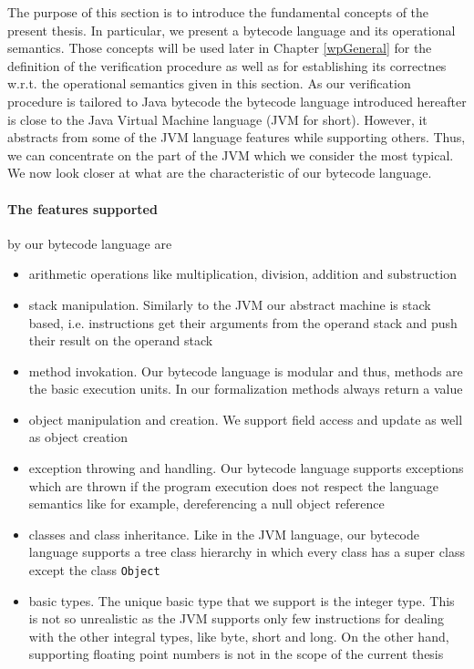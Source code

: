 \newtheorem{StateTransition}{Definition}[subsection]
\newtheorem{transClosStateTrans}[StateTransition]{Definition}

 The purpose of this section is to introduce the fundamental concepts of the
 present thesis. In particular, we present a bytecode language 
 and its operational semantics. Those concepts will be used later in Chapter \ref{wpGeneral}
 for the definition of the verification
 procedure as well as for establishing 
 its correctnes w.r.t. the operational semantics
 given in this section. As our verification procedure is tailored to Java bytecode 
 the bytecode language introduced hereafter is close to the Java Virtual Machine 
 language \cite{VMSpec}(JVM for short). However, it abstracts from some of the JVM language
 features while supporting others. Thus, we can concentrate on the part of the JVM which we consider
 the most typical. We now look closer at what are the characteristic of our bytecode language. 

\paragraph{The features supported}  by our bytecode language are 
\begin{itemize} 
   \item  arithmetic operations like multiplication, division, addition and substruction 
   \item  stack manipulation. Similarly to the JVM  our abstract machine is stack based, i.e. instructions
          get their arguments from the operand stack and push their result on the  operand stack
   \item  method invokation. Our bytecode language is modular and thus, methods are the basic execution units.
          In our formalization methods always return a value
   \item  object manipulation and creation. We support field access and update as well as object creation 
   \item  exception throwing and handling. Our bytecode language supports exceptions which are thrown if the program execution 
          does not respect the language semantics like for example, dereferencing a null object reference                 

   \item  classes and class inheritance. Like in the JVM language, our bytecode language supports  a tree class hierarchy in which every class 
          has a super class except the class \texttt{Object} 
   \item  basic types. The unique basic type that we support is the integer type. This is not so unrealistic as the JVM supports only few instructions
          for dealing with the other integral types, like byte, short and long. On the other hand, supporting floating point numbers is not in the scope
	  of the current thesis   
\end{itemize} 
 
